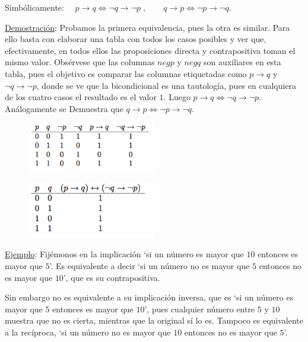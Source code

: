 Simbólicamente: $\quad  p \to q \Leftrightarrow \neg q \to \neg p\; , \qquad   q \to p \Leftrightarrow \neg p \to \neg q$.

\underline{Demostración}: Probamos la primera equivalencia, pues la otra es similar. Para ello basta con elaborar una tabla con todos los casos posibles y ver que, efectivamente, en todos ellos las proposiciones directa y contrapositiva toman el mismo valor. Obsérvese que las columnas $neg p$ y $neg q$ son auxiliares en esta tabla, pues el objetivo es comparar las columnas etiquetadas como $p \to q$ y $\neg q \to \neg p$, donde se ve que la bicondicional es una tautología, pues en cualquiera de los cuatro casos el resultado es el valor $1$. Luego $p \to q \Leftrightarrow \neg q \to \neg p$.  Análogamente se Demuestra que  $q \to p \Leftrightarrow \neg p \to \neg q$. 
	
	\begin{multicols}{2}
	\begin{figure}[H] 
		\centering
		\includegraphics[width=0.5\textwidth]{imagenes/apendices/APENDICESIM19.png}
	\end{figure}
	\begin{figure}[H] 
		\centering
		\includegraphics[width=0.5\textwidth]{imagenes/apendices/APENDICESIM20.png}
	\end{figure}
	\end{multicols}
\rightline{$\Box$}

\underline{Ejemplo}: Fijémonos en la implicación `si un número es mayor que $10$ entonces es mayor que $5$'. Es equivalente a decir `si un número no es mayor que $5$ entonces no es mayor que $10$', que es su contrapositiva.

Sin embargo no es equivalente a su implicación inversa, que es `si un número es mayor que $5$ entonces es mayor que $10$', pues cualquier número entre $5$ y $10$ muestra que no es cierta, mientras que la original sí lo es. Tampoco es equivalente a la recíproca, `si un número no es mayor que $10$ entonces no es mayor que $5$'.

